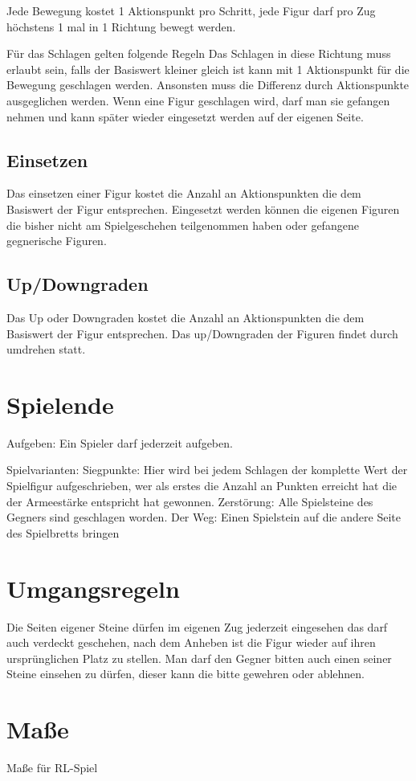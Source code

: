 \documentclass{article}
\begin{document}
Jede Bewegung kostet 1 Aktionspunkt pro Schritt, jede Figur darf pro Zug höchstens 1 mal in 1 Richtung bewegt werden.

Für das Schlagen gelten folgende Regeln
Das Schlagen in diese Richtung muss erlaubt sein, falls der Basiswert kleiner gleich ist kann mit 1 Aktionspunkt für die Bewegung geschlagen werden. Ansonsten muss die Differenz durch Aktionspunkte ausgeglichen werden. Wenn eine Figur geschlagen wird, darf man sie gefangen nehmen und kann später wieder eingesetzt werden auf der eigenen Seite.
	
\subsection{Einsetzen}
Das einsetzen einer Figur kostet die Anzahl an Aktionspunkten die dem Basiswert der Figur entsprechen. Eingesetzt werden können die eigenen Figuren die bisher nicht am Spielgeschehen teilgenommen haben oder gefangene gegnerische Figuren.
	
\subsection{Up/Downgraden}
Das Up oder Downgraden kostet die Anzahl an Aktionspunkten die dem Basiswert der Figur entsprechen. Das up/Downgraden der Figuren findet durch umdrehen statt.

\section{Spielende}
Aufgeben: Ein Spieler darf jederzeit aufgeben.

Spielvarianten:
Siegpunkte: Hier wird bei jedem Schlagen der komplette Wert der Spielfigur aufgeschrieben, wer als erstes die Anzahl an Punkten erreicht hat die der Armeestärke entspricht hat gewonnen.
Zerstörung: Alle Spielsteine des Gegners sind geschlagen worden.
Der Weg: Einen Spielstein auf die andere Seite des Spielbretts bringen


\section{Umgangsregeln}
Die Seiten eigener Steine dürfen im eigenen Zug jederzeit eingesehen das darf auch verdeckt geschehen, nach dem Anheben ist die Figur wieder auf ihren ursprünglichen Platz zu stellen. Man darf den Gegner bitten auch einen seiner Steine einsehen zu dürfen, dieser kann die bitte gewehren oder ablehnen.

\section{Maße}
Maße für RL-Spiel
	
\end{document}
